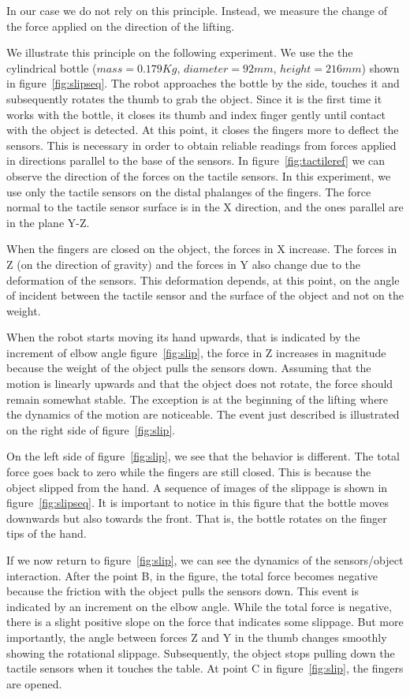 In our case we do not rely on this principle. Instead, we measure
the change of the force applied on the direction of the lifting.

We illustrate this principle on the following experiment. We use
the the cylindrical bottle ($mass=0.179 Kg$, $diameter=92 mm$,
$height=216 mm$) shown in figure~\ref{fig:slipseq}. The robot
approaches the bottle by the side, touches it and subsequently
rotates the thumb to grab the object. Since it is the first time
it works with the bottle, it closes its thumb and index finger
gently until contact with the object is detected. At this point,
it closes the fingers more to deflect the sensors. This is
necessary in order to obtain reliable readings from forces applied
in directions parallel to the base of the sensors. In
figure~\ref{fig:tactileref} we can observe the direction of the
forces on the tactile sensors. In this experiment, we use only the
tactile sensors on the distal phalanges of the fingers. The force
normal to the tactile sensor surface is in the X direction, and
the ones parallel are in the plane Y-Z.

When the fingers are closed on the object, the forces in X
increase. The forces in Z (on the direction of gravity) and the
forces in Y also change due to the deformation of the sensors.
This deformation depends, at this point, on the angle of incident
between the tactile sensor and the surface of the object and not
on the weight.

When the robot starts moving its hand upwards, that is indicated
by the increment of elbow angle figure~\ref{fig:slip}, the force
in Z increases in magnitude because the weight of the object pulls
the sensors down. Assuming that the motion is linearly upwards and
that the object does not rotate, the force should remain somewhat
stable. The exception is at the beginning of the lifting where the
dynamics of the motion are noticeable. The event just described is
illustrated on the right side of figure~\ref{fig:slip}.

On the left side of figure~\ref{fig:slip}, we see that the
behavior is different. The total force goes back to zero while the
fingers are still closed. This is because the object slipped from
the hand. A sequence of images of the slippage is shown in
figure~\ref{fig:slipseq}. It is important to notice in this figure
that the bottle moves downwards but also towards the front. That
is, the bottle rotates on the finger tips of the hand.

If we now return to figure~\ref{fig:slip}, we can see the dynamics
of the sensors/object interaction. After the point B, in the
figure, the total force becomes negative because the friction with
the object pulls the sensors down. This event is indicated by an
increment on the elbow angle. While the total force is negative,
there is a slight positive slope on the force that indicates some
slippage. But more importantly, the angle between forces Z and Y
in the thumb changes smoothly showing the rotational slippage.
Subsequently, the object stops pulling down the tactile sensors
when it touches the table. At point C in figure~\ref{fig:slip},
the fingers are opened.


